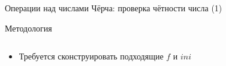\begin{frame}{Операции над числами Чёрча: проверка чётности числа (1)}
\begin{block}{Методология}
\begin{enumerate}
\begin{columns}[onlytextwidth]
                    \begin{column}{0.51\textwidth}
                        \vspace{-2em}
                        \begin{itemize}
                            \item \pause Требуется сконструировать подходящие $f$ и $ini$
                        \end{itemize}
                    \end{column}
                    \vspace{-1em}
                \end{columns}
            \end{enumerate}
        \end{block}
    \end{frame}

